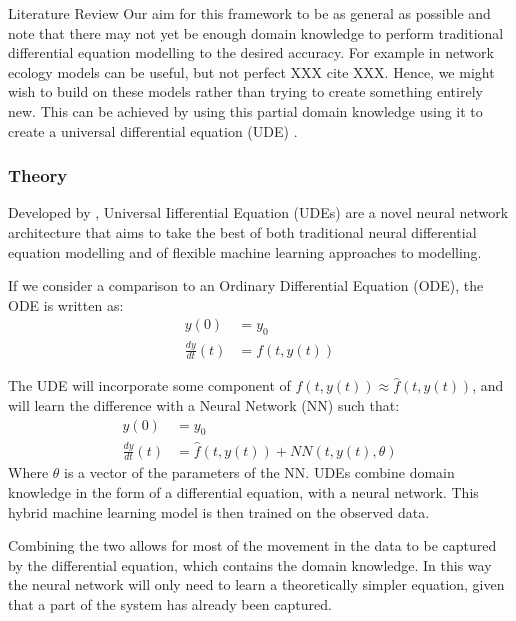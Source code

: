 \documentclass[12pt]{amsart}
\begin{document}
\begin{section}{Literature Review}
        Our aim for this framework to be as general as possible and note that there may not yet be enough domain knowledge to perform traditional differential equation modelling to the desired accuracy. For example in network ecology models can be useful, but not perfect XXX cite XXX. Hence, we might wish to build on these models rather than trying to create something entirely new. This can be achieved by using this partial domain knowledge using it to create a universal differential equation (UDE) \cite{SciML_C_Rak}.

        \subsubsection{Theory}

            Developed by \cite{SciML_C_Rak}, Universal Iifferential Equation (UDEs) are a novel neural network architecture that aims to take the best of both traditional neural differential equation modelling and of flexible machine learning approaches to modelling. 

            If we consider a comparison to an Ordinary Differential Equation (ODE), the ODE is written as:
            \begin{align}
                y(0) &= y_0 \\
                \frac{dy}{dt}(t)&=f(t,y(t))
            \end{align}
            
            The UDE will incorporate some component of $f(t,y(t))\approx \hat f(t,y(t))$, and will learn the difference with a Neural Network (NN) such that:
            \begin{align}
                \label{UDE}
                y(0) &= y_0 \\
                \frac{dy}{dt}(t)&=\hat f(t,y(t))+NN(t,y(t), \theta)
            \end{align}
            Where $\theta$ is a vector of the parameters of the NN.
            UDEs combine domain knowledge in the form of a differential equation, with a neural network. This hybrid machine learning model is then trained on the observed data.
            
            Combining the two allows for most of the movement in the data to be captured by the differential equation, which contains the domain knowledge. In this way the neural network will only need to learn a theoretically simpler equation, given that a part of the system has already been captured. 
            

\end{section}
\end{document}
